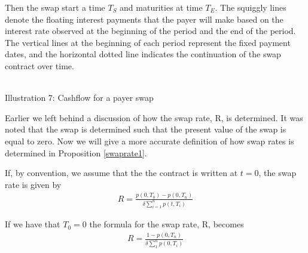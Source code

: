 Then the swap start a time $T_S$ and maturities at time $T_E$.
The squiggly lines denote the floating interest payments that the payer will make based on the interest rate observed 
at the beginning of the period and the end of the period. The vertical lines at the beginning of each period represent
the fixed payment dates, and the horizontal dotted line indicates the continuation of the swap contract over time.
\begin{center}
    \\[10pt] 
    Illustration 7: Cashflow for a payer swap 
\end{center}
Earlier we left behind a discussion of how the swap rate, R,  is determined. 
It was noted that the swap is determined such that the present value of
the swap is equal to zero. Now we will give a more accurate definition of how swap rates is determined in Proposition \ref{swaprate1}.
\begin{proposition}
    If, by convention, we assume that the the contract is written at $t=0$, 
    the swap rate is given by \cite{Bjork}
    \begin{align*}
        R = \frac{p(0,T_0)-p(0,T_n)}{\delta \sum_{i=1}^{n}p(t,T_i)}
    \end{align*} 
    \label{swaprate1}
\end{proposition}
\noindent 
If we have that $T_0=0$ the formula for the swap rate, R, becomes
\begin{align*}
    R= \frac{1-p(0,T_n)}{\delta \sum_{1}^{n}p(0,T_i)}
\end{align*}
